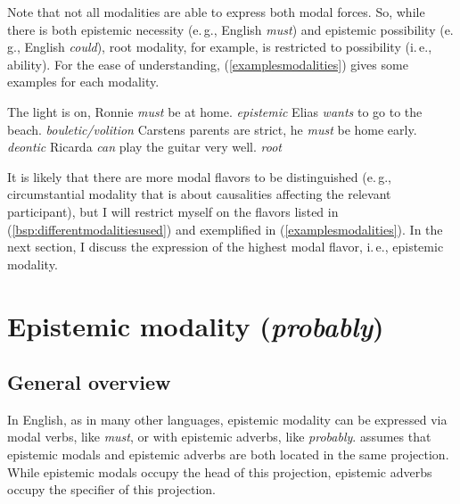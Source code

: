 \noindent Note that not all modalities are able to express both modal forces. So, while there is both epistemic necessity (e.\,g., English \textit{must}) and epistemic possibility (e.\,g., English \textit{could}), root modality, for example, is restricted to possibility (i.\,e., ability). For the ease of understanding, (\ref{examplesmodalities}) gives some examples for each modality.

\begin{exe} 
\ex \label{examplesmodalities}\begin{xlist} 
\ex  The light is on, Ronnie \textit{must} be at home.  \hfill\textit{epistemic} \label{examplesmodalitiesa}
\ex  Elias \textit{wants} to go to the beach.  \hfill\textit{bouletic/volition} \label{examplesmodalitiesb}
\ex  Carstens parents are strict, he \textit{must} be home early.  \hfill\textit{deontic} \label{examplesmodalitiesc}
\ex  Ricarda \textit{can} play the guitar very well.  \hfill\textit{root} \label{examplesmodalitiese}
\end{xlist} 
\end{exe} 

\noindent It is likely that there are more modal flavors to be distinguished (e.\,g., circumstantial modality that is about causalities affecting the relevant participant), but I will restrict myself on the flavors listed in (\ref{bsp:differentmodalitiesused}) and exemplified in (\ref{examplesmodalities}). In the next section, I discuss the expression of the highest modal flavor, i.\,e., epistemic modality.  

\section{Epistemic modality (\textit{probably})}\label{sectionepistemic}
\subsection{General overview}
In English, as in many other languages, epistemic modality can be expressed via modal verbs, like \textit{must}, or with epistemic adverbs, like \textit{probably}. \citet[86]{cinque1999adverbs} assumes that epistemic modals and epistemic adverbs are both located in the same projection. While epistemic modals occupy the head of this projection, epistemic adverbs occupy the specifier of this projection. 

